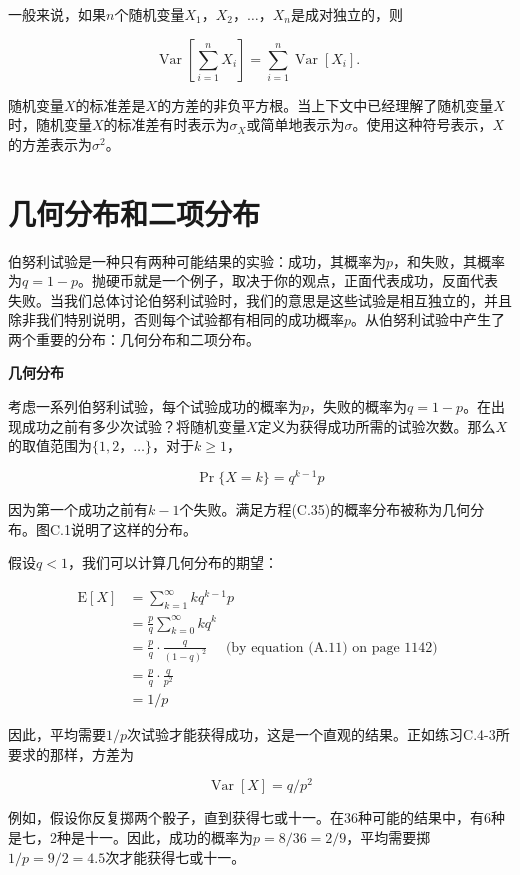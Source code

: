 \documentclass[lang=cn,newtx,10pt,scheme=chinese]{elegantbook}
\begin{document}
一般来说，如果$n$个随机变量$X_1，X_2，\ldots，X_n$是成对独立的，则

$$
\operatorname{Var}\left[\sum_{i=1}^n X_i\right]=\sum_{i=1}^n \operatorname{Var}\left[X_i\right] \text {. }
$$

随机变量$X$的标准差是$X$的方差的非负平方根。当上下文中已经理解了随机变量$X$时，随机变量$X$的标准差有时表示为$\sigma_X$或简单地表示为$\sigma$。使用这种符号表示，$X$的方差表示为$\sigma^2$。

\section{几何分布和二项分布}\label{section:C.4}

伯努利试验是一种只有两种可能结果的实验：成功，其概率为$p$，和失败，其概率为$q=1-p$。抛硬币就是一个例子，取决于你的观点，正面代表成功，反面代表失败。当我们总体讨论伯努利试验时，我们的意思是这些试验是相互独立的，并且除非我们特别说明，否则每个试验都有相同的成功概率$p$。从伯努利试验中产生了两个重要的分布：几何分布和二项分布。

\textbf{几何分布}

考虑一系列伯努利试验，每个试验成功的概率为$p$，失败的概率为$q=1-p$。在出现成功之前有多少次试验？将随机变量$X$定义为获得成功所需的试验次数。那么$X$的取值范围为$\{1,2，\ldots\}$，对于$k \geq 1$，

$$
\operatorname{Pr}\{X=k\}=q^{k-1} p
$$

因为第一个成功之前有$k-1$个失败。满足方程(C.35)的概率分布被称为几何分布。图C.1说明了这样的分布。

假设$q<1$，我们可以计算几何分布的期望：

$$
\begin{aligned}
\mathrm{E}[X] & =\sum_{k=1}^{\infty} k q^{k-1} p \\
& =\frac{p}{q} \sum_{k=0}^{\infty} k q^k \\
& =\frac{p}{q} \cdot \frac{q}{(1-q)^2} \quad \text { (by equation (A.11) on page 1142) } \\
& =\frac{p}{q} \cdot \frac{q}{p^2} \\
& =1 / p
\end{aligned}
$$

因此，平均需要$1 / p$次试验才能获得成功，这是一个直观的结果。正如练习C.4-3所要求的那样，方差为

$$
\operatorname{Var}[X]=q / p^2
$$

例如，假设你反复掷两个骰子，直到获得七或十一。在36种可能的结果中，有6种是七，2种是十一。因此，成功的概率为$p=8 / 36=2 / 9$，平均需要掷$1 / p=9 / 2=4.5$次才能获得七或十一。
\end{document}
